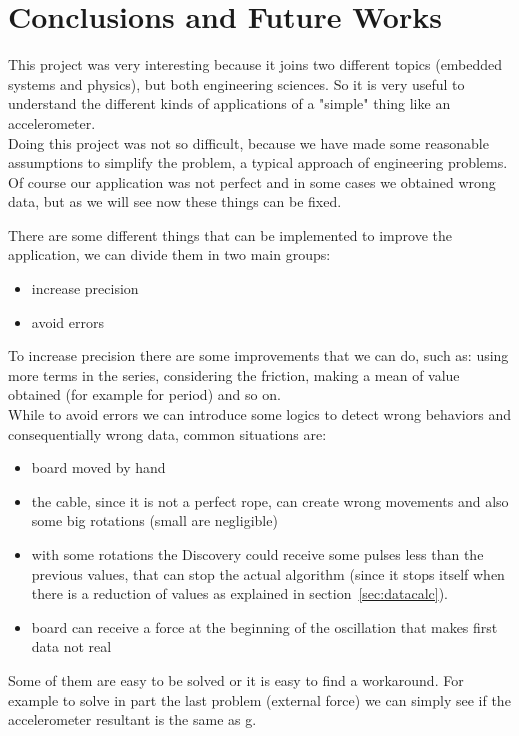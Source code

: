 \section{Conclusions and Future Works}
\label{sec:conclusions}
This project was very interesting because it joins two different topics (embedded systems and physics), but both engineering sciences. So it is very useful to understand the different kinds of applications of a "simple" thing like an accelerometer.\\
Doing this project was not so difficult, because we have made some reasonable assumptions to simplify the problem, a typical approach of engineering problems. Of course our application was not perfect and in some cases we obtained wrong data, but as we will see now these things can be fixed.\par
There are some different things that can be implemented to improve the application, we can divide them in two main groups:
\begin{itemize}
	\item increase precision
	\item avoid errors
\end{itemize}
To increase precision there are some improvements that we can do, such as: using more terms in the series, considering the friction, making a mean of value obtained (for example for period) and so on.\\
While to avoid errors we can introduce some logics to detect wrong behaviors and consequentially wrong data, common situations are:
\begin{itemize}
	\item board moved by hand
	\item the cable, since it is not a perfect rope, can create wrong movements and also some big rotations (small are negligible)
	\item with some rotations the Discovery could receive some pulses less than the previous values, that can stop the actual algorithm (since it stops itself when there is a reduction of values as explained in section~\ref{sec:datacalc}).
	\item board can receive a force at the beginning of the oscillation that makes first data not real
\end{itemize}
Some of them are easy to be solved or it is easy to find a workaround. For example to solve in part the last problem (external force) we can simply see if the accelerometer resultant is the same as g.

